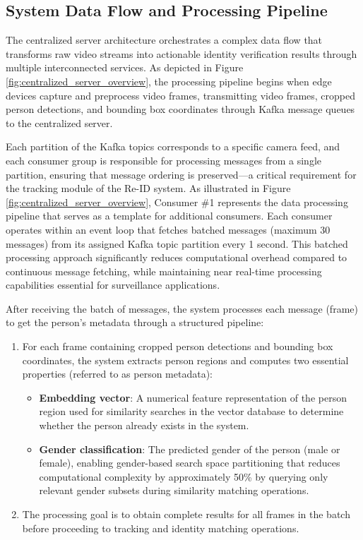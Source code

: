 \subsection{System Data Flow and Processing Pipeline}

The centralized server architecture orchestrates a complex data flow that transforms raw video streams into actionable identity verification results through multiple interconnected services. As depicted in Figure \ref{fig:centralized_server_overview}, the processing pipeline begins when edge devices capture and preprocess video frames, transmitting video frames, cropped person detections, and bounding box coordinates through Kafka message queues to the centralized server.

Each partition of the Kafka topics corresponds to a specific camera feed, and each consumer group is responsible for processing messages from a single partition, ensuring that message ordering is preserved—a critical requirement for the tracking module of the Re-ID system. As illustrated in Figure \ref{fig:centralized_server_overview}, Consumer \#1 represents the data processing pipeline that serves as a template for additional consumers. Each consumer operates within an event loop that fetches batched messages (maximum 30 messages) from its assigned Kafka topic partition every 1 second. This batched processing approach significantly reduces computational overhead compared to continuous message fetching, while maintaining near real-time processing capabilities essential for surveillance applications.

After receiving the batch of messages, the system processes each message (frame) to get the person's metadata through a structured pipeline:

\begin{enumerate}
   \item For each frame containing cropped person detections and bounding box coordinates, the system extracts person regions and computes two essential properties (referred to as person metadata):
   \begin{itemize}
       \item \textbf{Embedding vector}: A numerical feature representation of the person region used for similarity searches in the vector database to determine whether the person already exists in the system.
       \item \textbf{Gender classification}: The predicted gender of the person (male or female), enabling gender-based search space partitioning that reduces computational complexity by approximately 50\% by querying only relevant gender subsets during similarity matching operations.
   \end{itemize}
   \item The processing goal is to obtain complete results for all frames in the batch before proceeding to tracking and identity matching operations.
\end{enumerate}

